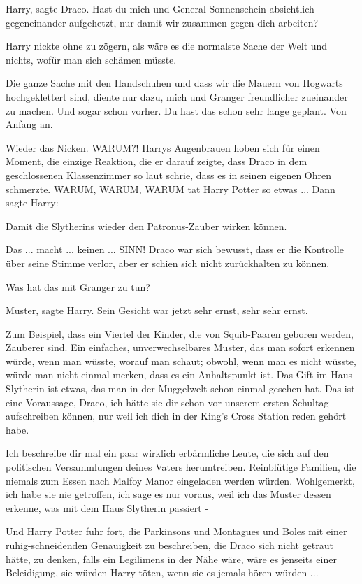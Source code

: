 \glqq{}Harry\grqq{}, sagte Draco. \glqq{}Hast du mich und General Sonnenschein
absichtlich gegeneinander aufgehetzt, nur damit wir zusammen gegen dich
arbeiten?\grqq{}

Harry nickte ohne zu zögern, als wäre es die normalste Sache der Welt und
nichts, wofür man sich schämen müsste.

\glqq{}Die ganze Sache mit den Handschuhen und dass wir die Mauern von Hogwarts
hochgeklettert sind, diente nur dazu, mich und Granger freundlicher zueinander
zu machen. Und sogar schon vorher. Du hast das schon sehr lange geplant. Von
Anfang an.\grqq{}

Wieder das Nicken. \glqq{}WARUM?!\grqq{} Harrys Augenbrauen hoben sich für einen
Moment, die einzige Reaktion, die er darauf zeigte, dass Draco in dem
geschlossenen Klassenzimmer so laut schrie, dass es in seinen eigenen Ohren
schmerzte. WARUM, WARUM, WARUM tat Harry Potter so etwas ... Dann sagte Harry:

\glqq{}Damit die Slytherins wieder den Patronus-Zauber wirken können.\grqq{}

\glqq{}Das ... macht ... keinen ... SINN!\grqq{} Draco war sich bewusst, dass er die
Kontrolle über seine Stimme verlor, aber er schien sich nicht zurückhalten zu
können.

\glqq{}Was hat das mit Granger zu tun?\grqq{}

\glqq{}Muster\grqq{}, sagte Harry. Sein Gesicht war jetzt sehr ernst, sehr sehr
ernst.

\glqq{}Zum Beispiel, dass ein Viertel der Kinder, die von Squib-Paaren geboren
werden, Zauberer sind. Ein einfaches, unverwechselbares Muster, das man sofort
erkennen würde, wenn man wüsste, worauf man schaut; obwohl, wenn man es nicht
wüsste, würde man nicht einmal merken, dass es ein Anhaltspunkt ist. Das Gift im
Haus Slytherin ist etwas, das man in der Muggelwelt schon einmal gesehen hat.
Das ist eine Voraussage, Draco, ich hätte sie dir schon vor unserem ersten
Schultag aufschreiben können, nur weil ich dich in der King's Cross Station
reden gehört habe.

Ich beschreibe dir mal ein paar wirklich erbärmliche Leute, die sich auf den
politischen Versammlungen deines Vaters herumtreiben. Reinblütige Familien, die
niemals zum Essen nach Malfoy Manor eingeladen werden würden. Wohlgemerkt, ich
habe sie nie getroffen, ich sage es nur voraus, weil ich das Muster dessen
erkenne, was mit dem Haus Slytherin passiert -\grqq{}

Und Harry Potter fuhr fort, die Parkinsons und Montagues und Boles mit einer
ruhig-schneidenden Genauigkeit zu beschreiben, die Draco sich nicht getraut
hätte, zu denken, falls ein Legilimens in der Nähe wäre, wäre es jenseits einer
Beleidigung, sie würden Harry töten, wenn sie es jemals hören würden ...


